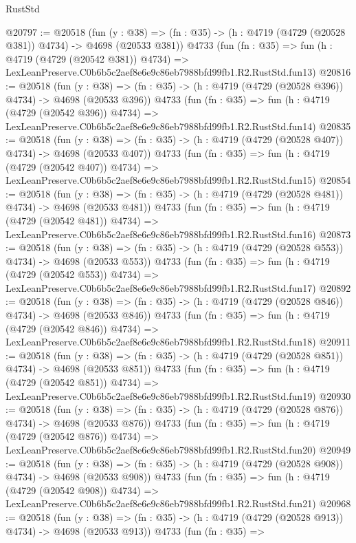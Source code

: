 \begin{lexlean}{RustStd}
\begin{coremodule}
@20797 := @20518
    (fun (y : @38) => (fn : @35) -> (h : @4719 (@4729 (@20528 @381)) @4734) -> @4698 (@20533 @381))
    @4733
    (fun (fn : @35) =>
    fun (h : @4719 (@4729 (@20542 @381)) @4734) =>
    LexLeanPreserve.C0b6b5c2aef8e6e9c86eb7988bfd99fb1.R2.RustStd.fun13)
@20816 := @20518
    (fun (y : @38) => (fn : @35) -> (h : @4719 (@4729 (@20528 @396)) @4734) -> @4698 (@20533 @396))
    @4733
    (fun (fn : @35) =>
    fun (h : @4719 (@4729 (@20542 @396)) @4734) =>
    LexLeanPreserve.C0b6b5c2aef8e6e9c86eb7988bfd99fb1.R2.RustStd.fun14)
@20835 := @20518
    (fun (y : @38) => (fn : @35) -> (h : @4719 (@4729 (@20528 @407)) @4734) -> @4698 (@20533 @407))
    @4733
    (fun (fn : @35) =>
    fun (h : @4719 (@4729 (@20542 @407)) @4734) =>
    LexLeanPreserve.C0b6b5c2aef8e6e9c86eb7988bfd99fb1.R2.RustStd.fun15)
@20854 := @20518
    (fun (y : @38) => (fn : @35) -> (h : @4719 (@4729 (@20528 @481)) @4734) -> @4698 (@20533 @481))
    @4733
    (fun (fn : @35) =>
    fun (h : @4719 (@4729 (@20542 @481)) @4734) =>
    LexLeanPreserve.C0b6b5c2aef8e6e9c86eb7988bfd99fb1.R2.RustStd.fun16)
@20873 := @20518
    (fun (y : @38) => (fn : @35) -> (h : @4719 (@4729 (@20528 @553)) @4734) -> @4698 (@20533 @553))
    @4733
    (fun (fn : @35) =>
    fun (h : @4719 (@4729 (@20542 @553)) @4734) =>
    LexLeanPreserve.C0b6b5c2aef8e6e9c86eb7988bfd99fb1.R2.RustStd.fun17)
@20892 := @20518
    (fun (y : @38) => (fn : @35) -> (h : @4719 (@4729 (@20528 @846)) @4734) -> @4698 (@20533 @846))
    @4733
    (fun (fn : @35) =>
    fun (h : @4719 (@4729 (@20542 @846)) @4734) =>
    LexLeanPreserve.C0b6b5c2aef8e6e9c86eb7988bfd99fb1.R2.RustStd.fun18)
@20911 := @20518
    (fun (y : @38) => (fn : @35) -> (h : @4719 (@4729 (@20528 @851)) @4734) -> @4698 (@20533 @851))
    @4733
    (fun (fn : @35) =>
    fun (h : @4719 (@4729 (@20542 @851)) @4734) =>
    LexLeanPreserve.C0b6b5c2aef8e6e9c86eb7988bfd99fb1.R2.RustStd.fun19)
@20930 := @20518
    (fun (y : @38) => (fn : @35) -> (h : @4719 (@4729 (@20528 @876)) @4734) -> @4698 (@20533 @876))
    @4733
    (fun (fn : @35) =>
    fun (h : @4719 (@4729 (@20542 @876)) @4734) =>
    LexLeanPreserve.C0b6b5c2aef8e6e9c86eb7988bfd99fb1.R2.RustStd.fun20)
@20949 := @20518
    (fun (y : @38) => (fn : @35) -> (h : @4719 (@4729 (@20528 @908)) @4734) -> @4698 (@20533 @908))
    @4733
    (fun (fn : @35) =>
    fun (h : @4719 (@4729 (@20542 @908)) @4734) =>
    LexLeanPreserve.C0b6b5c2aef8e6e9c86eb7988bfd99fb1.R2.RustStd.fun21)
@20968 := @20518
    (fun (y : @38) => (fn : @35) -> (h : @4719 (@4729 (@20528 @913)) @4734) -> @4698 (@20533 @913))
    @4733
    (fun (fn : @35) =>

\end{coremodule}
\end{lexlean}
